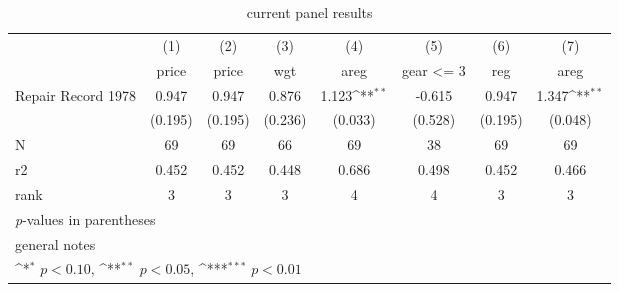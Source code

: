 \begin{table}[htbp]\centering
\def\sym#1{\ifmmode^{#1}\else\(^{#1}\)\fi}
\caption{current panel results}
\begin{tabular}{l*{7}{c}}
\toprule
                    &\multicolumn{1}{c}{(1)}&\multicolumn{1}{c}{(2)}&\multicolumn{1}{c}{(3)}&\multicolumn{1}{c}{(4)}&\multicolumn{1}{c}{(5)}&\multicolumn{1}{c}{(6)}&\multicolumn{1}{c}{(7)}\\
                    &\multicolumn{1}{c}{price}&\multicolumn{1}{c}{price}&\multicolumn{1}{c}{wgt}&\multicolumn{1}{c}{areg}&\multicolumn{1}{c}{gear <= 3}&\multicolumn{1}{c}{reg}&\multicolumn{1}{c}{areg}\\
\midrule
Repair Record 1978  &       0.947         &       0.947         &       0.876         &       1.123\sym{**} &      -0.615         &       0.947         &       1.347\sym{**} \\
                    &     (0.195)         &     (0.195)         &     (0.236)         &     (0.033)         &     (0.528)         &     (0.195)         &     (0.048)         \\
\midrule
N                   &          69         &          69         &          66         &          69         &          38         &          69         &          69         \\
r2                  &       0.452         &       0.452         &       0.448         &       0.686         &       0.498         &       0.452         &       0.466         \\
rank                &           3         &           3         &           3         &           4         &           4         &           3         &           3         \\
\bottomrule
\multicolumn{8}{l}{\footnotesize \textit{p}-values in parentheses}\\
\multicolumn{8}{l}{\footnotesize general notes}\\
\multicolumn{8}{l}{\footnotesize \sym{*} \(p<0.10\), \sym{**} \(p<0.05\), \sym{***} \(p<0.01\)}\\
\end{tabular}
\end{table}
